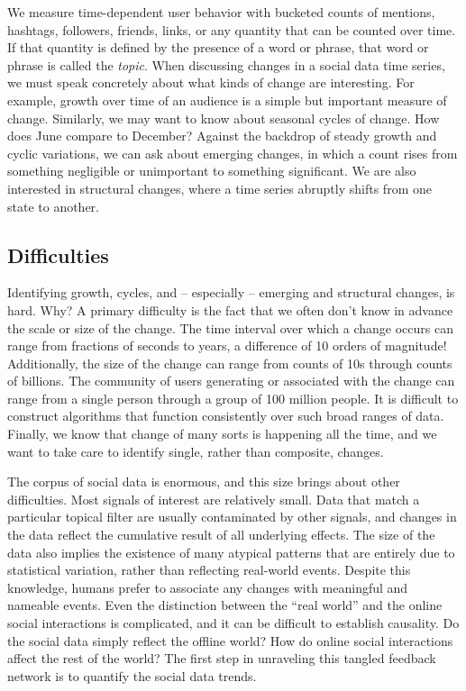 \documentclass{article}
\begin{document}
We measure time-dependent user behavior with bucketed counts of mentions,
hashtags, followers, friends, links, or any quantity that can be counted over
time. If that quantity is defined by the presence of a word or phrase, that
word or phrase is called the \textit{topic}. When discussing changes in a
social data time series, we must speak concretely about what kinds of change
are interesting. For example, growth over time of an audience is a simple but
important measure of change. Similarly, we may want to know about seasonal
cycles of change. How does June compare to December? Against the backdrop of
steady growth and cyclic variations, we can ask about emerging changes, in
which a count rises from something negligible or unimportant to something
significant. We are also interested in structural changes, where a time series
abruptly shifts from one state to another.

\subsection{Difficulties} Identifying growth, cycles, and -- especially -- emerging
and structural changes, is hard. Why? A primary difficulty is the fact that we
often don't know in advance the scale or size of the change. The time interval
over which a change occurs can range from fractions of seconds to years, a
difference of 10 orders of magnitude! Additionally, the size of the change can range from
counts of 10s through counts of billions. The community of users generating or
associated with the change can range from a single person through a group of
100 million people. It is difficult to construct algorithms that function
consistently over such broad ranges of data. Finally, we know that change of many
sorts is happening all the time, and we want to take care to identify single,
rather than composite, changes.

The corpus of social data is enormous, and this size brings about other
difficulties. Most signals of interest are relatively small.  Data that match a
particular topical filter are usually contaminated by other signals, and
changes in the data reflect the cumulative result of all underlying effects.
The size of the data also implies the existence of many atypical patterns that
are entirely due to statistical variation, rather than reflecting real-world
events. Despite this knowledge, humans prefer to associate any changes with
meaningful and nameable events. 
Even the distinction between the “real world” and the online social
interactions is complicated, and it can be difficult to establish causality. Do
the social data simply reflect the offline world? How do online social
interactions affect the rest of the world?  The first step in unraveling this
tangled feedback network is to quantify the social data trends.  
\end{document}
